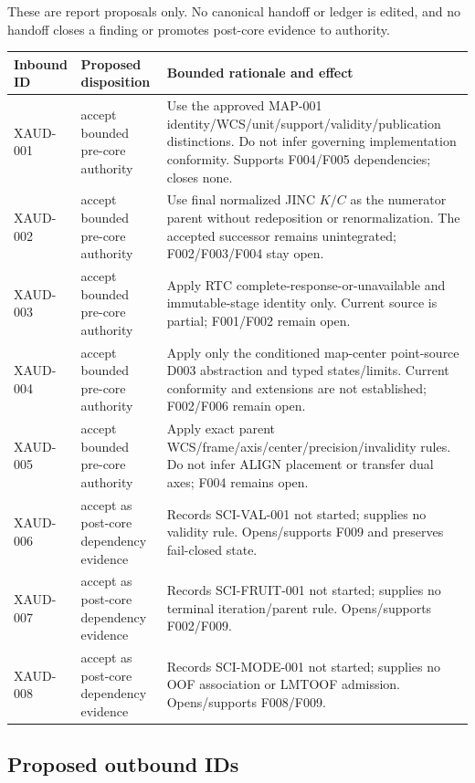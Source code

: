 \documentclass[10pt]{article}
\newcommand{\code}[1]{\texttt{\detokenize{#1}}}
\begin{document}
These are report proposals only.  No canonical handoff or ledger is edited,
and no handoff closes a finding or promotes post-core evidence to authority.

\begin{longtable}{@{}L{0.15\textwidth}L{0.16\textwidth}L{0.61\textwidth}@{}}
\toprule
Inbound ID & Proposed disposition & Bounded rationale and effect \\
\midrule
\endhead
XAUD-001 & accept bounded pre-core authority &
Use the approved MAP-001 identity/WCS/unit/support/validity/publication
distinctions.  Do not infer governing implementation conformity.  Supports
F004/F005 dependencies; closes none. \\
XAUD-002 & accept bounded pre-core authority &
Use final normalized JINC $K/C$ as the numerator parent without redeposition or
renormalization.  The accepted \code{86f1582} successor remains unintegrated;
F002/F003/F004 stay open. \\
XAUD-003 & accept bounded pre-core authority &
Apply RTC complete-response-or-unavailable and immutable-stage identity only.
Current source is partial; F001/F002 remain open. \\
XAUD-004 & accept bounded pre-core authority &
Apply only the conditioned map-center point-source D003 abstraction and typed
states/limits.  Current conformity and extensions are not established;
F002/F006 remain open. \\
XAUD-005 & accept bounded pre-core authority &
Apply exact parent WCS/frame/axis/center/precision/invalidity rules.  Do not
infer ALIGN placement or transfer dual axes; F004 remains open. \\
XAUD-006 & accept as post-core dependency evidence &
Records SCI-VAL-001 not started; supplies no validity rule.  Opens/supports
F009 and preserves fail-closed state. \\
XAUD-007 & accept as post-core dependency evidence &
Records SCI-FRUIT-001 not started; supplies no terminal iteration/parent rule.
Opens/supports F002/F009. \\
XAUD-008 & accept as post-core dependency evidence &
Records SCI-MODE-001 not started; supplies no OOF association or LMTOOF
admission.  Opens/supports F008/F009. \\
\bottomrule
\end{longtable}

\subsection{Proposed outbound IDs}
\end{document}
